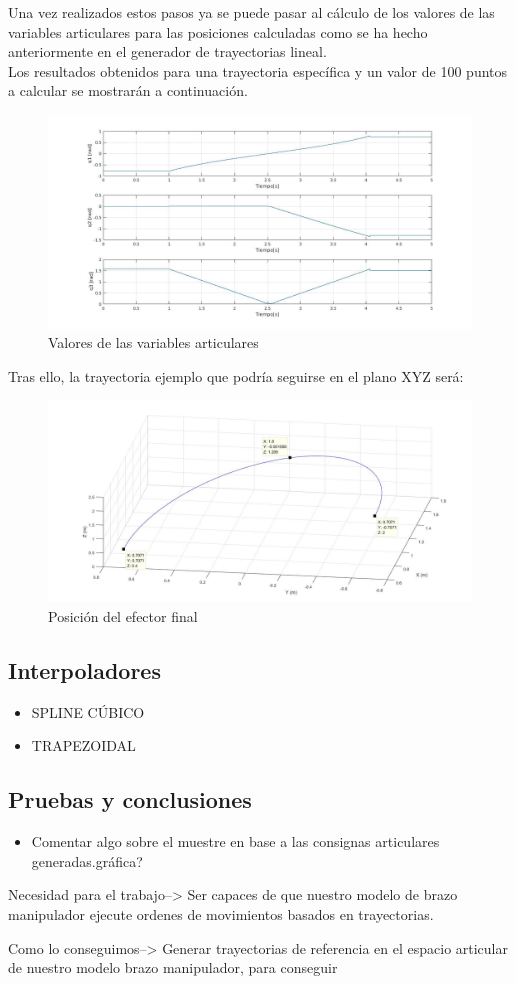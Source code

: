	Una vez realizados estos pasos ya se puede pasar al cálculo de los valores de las variables articulares para las posiciones calculadas como se ha hecho anteriormente en el generador de trayectorias lineal.\\

	Los resultados obtenidos para una trayectoria específica y un valor de 100 puntos a calcular se mostrarán a continuación.
	\begin{figure}[h!]
	\centering
	\includegraphics[width=.7\textwidth]{GDT_C_articulares}
	\caption{Valores de las variables articulares}
	\end{figure}

\newpage
Tras ello, la trayectoria ejemplo que podría seguirse en el plano XYZ será:
	\begin{figure}[h!]
	\centering
	\includegraphics[width=.8\textwidth]{GDT_C_efector}
	\caption{Posición del efector final}
	\end{figure}

	
	\subsection{Interpoladores}
	\begin{itemize}
		\item SPLINE CÚBICO
		\item TRAPEZOIDAL
	\end{itemize}
	
	
	
	
	\subsection{Pruebas y conclusiones}
	\begin{itemize}
		\item Comentar algo sobre el muestre en base a las consignas articulares generadas.gráfica?
	\end{itemize}
		Necesidad para el trabajo-->
		 Ser capaces de que nuestro modelo de brazo manipulador ejecute ordenes de movimientos basados en trayectorias.

	    Como lo conseguimos-->
	   		Generar trayectorias de referencia en el espacio articular de nuestro modelo brazo manipulador, para conseguir
